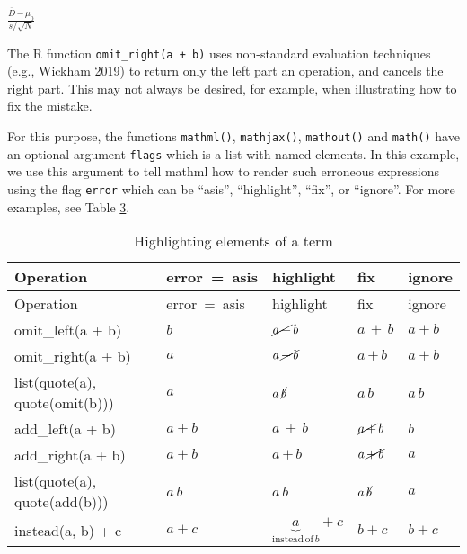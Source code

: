\(\displaystyle{\frac{{\overline{D}}{{\,}{\boxed{{-}{{\,}{{\mu}_{0}}}}}}}{{s}{/}{\sqrt{N}}}}\)

The R function \texttt{omit\_right(a~+~b)} uses non-standard evaluation
techniques (e.g., Wickham 2019) to return only the left part an
operation, and cancels the right part. This may not always be desired,
for example, when illustrating how to fix the mistake.

For this purpose, the functions \texttt{mathml()}, \texttt{mathjax()}, \texttt{mathout()} and
\texttt{math()} have an optional argument \texttt{flags} which is a list with named
elements. In this example, we use this argument to tell mathml how to
render such erroneous expressions using the flag \texttt{error} which can be
``asis'', ``highlight'', ``fix'', or ``ignore''. For more examples, see Table
\protect\hyperlink{tab:mistakes}{3}.

\hypertarget{tab:mistakes}{}
\begin{longtable}[]{@{}lllll@{}}
\caption{Highlighting elements of a term}\tabularnewline
\toprule\noalign{}
Operation & error~=~asis & highlight & fix & ignore \\
\midrule\noalign{}
\endfirsthead
\toprule\noalign{}
Operation & error~=~asis & highlight & fix & ignore \\
\midrule\noalign{}
\endhead
\bottomrule\noalign{}
\endlastfoot
omit\_left(a + b) & \(b\) & \({\cancel{{a}{{\,}{+}}}}{{\,}{b}}\) & \({\boxed{{a}{{\,}{+}}}}{{\,}{b}}\) & \({a}{+}{b}\) \\
omit\_right(a + b) & \(a\) & \({a}{{\,}{\cancel{{+}{{\,}{b}}}}}\) & \({a}{{\,}{\boxed{{+}{{\,}{b}}}}}\) & \({a}{+}{b}\) \\
list(quote(a), quote(omit(b))) & \({a}{{\,}{\mathrm{}}}\) & \({a}{{\,}{\cancel{b}}}\) & \({a}{{\,}{\boxed{b}}}\) & \({a}{{\,}{b}}\) \\
add\_left(a + b) & \({a}{+}{b}\) & \({\boxed{{a}{{\,}{+}}}}{{\,}{b}}\) & \({\cancel{{a}{{\,}{+}}}}{{\,}{b}}\) & \(b\) \\
add\_right(a + b) & \({a}{+}{b}\) & \({a}{{\,}{\boxed{{+}{{\,}{b}}}}}\) & \({a}{{\,}{\cancel{{+}{{\,}{b}}}}}\) & \(a\) \\
list(quote(a), quote(add(b))) & \({a}{{\,}{b}}\) & \({a}{{\,}{\boxed{b}}}\) & \({a}{{\,}{\cancel{b}}}\) & \({a}{{\,}{\mathrm{}}}\) \\
instead(a, b) + c & \({a}{+}{c}\) & \({\underbrace{a}_{{\mathrm{instead}}{{\,}{\mathrm{of}}{{\,}{b}}}}}{+}{c}\) & \({\boxed{b}}{+}{c}\) & \({b}{+}{c}\) \\
\end{longtable}

